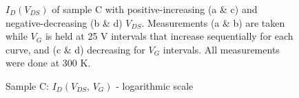 \begin{figure}
\begin{centering}
{\begin{minipage}[t]{0.3\paperwidth}
\begin{flushright}
\par\end{flushright}%
\end{minipage}}\quad{}
\par\end{centering}
\begin{centering}
\caption{Sample C: $I_{D}\left(V_{DS},\,V_{G}\right)$ - logarithmic scale\label{fig:Sample-C-IDvsVDS-log}}
\par\end{centering}
$I_{D}\left(V_{DS}\right)$ of sample C with positive-increasing (a
\& c) and negative-decreasing (b \& d) $V_{DS}$. Measurements (a
\& b) are taken while $V_{G}$ is held at 25 V intervals that increase
sequentially for each curve, and (c \& d) decreasing for $V_{G}$
intervals. All measurements were done at 300 K.
\end{figure}

